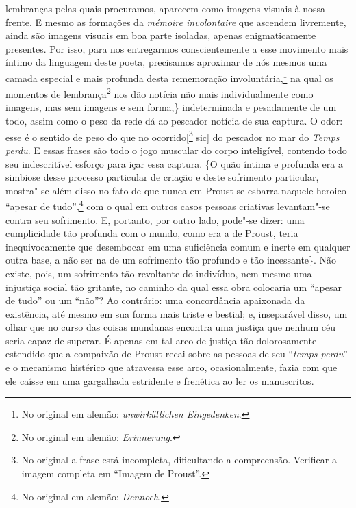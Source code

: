 lembranças pelas quais procuramos, aparecem como imagens visuais à nossa
frente. E mesmo as formações da \emph{mémoire involontaire} que ascendem
livremente, ainda são imagens visuais em boa parte isoladas, apenas
enigmaticamente presentes. Por isso, para nos entregarmos
conscientemente a esse movimento mais íntimo da linguagem deste poeta,
precisamos aproximar de nós mesmos uma camada especial e mais profunda
desta rememoração involuntária,\footnote{No original em alemão:
\emph{unwirküllichen Eingedenken}. \versal{[N.~T.]}} na qual os momentos de
lembrança\footnote{No original em alemão: \emph{Erinnerung}. \versal{[N.~T.]}} nos dão notícia
não mais individualmente como imagens, mas sem imagens e sem forma,\}
indeterminada e pesadamente de um todo, assim como o peso da rede dá ao
pescador notícia de sua captura. O odor: esse é o sentido de peso do que
no ocorrido{[}\footnote{No original a frase está incompleta,
  dificultando a compreensão. Verificar a imagem completa em ``Imagem de Proust''. \versal{[N.~T.]}} sic{]} do pescador no mar do \emph{Temps
perdu}. E essas frases são todo o jogo muscular do corpo inteligível,
contendo todo seu indescritível esforço para içar essa captura. \{O
quão íntima e profunda era a simbiose desse processo particular de
criação e deste sofrimento particular, mostra"-se além disso no fato
de que nunca em Proust se esbarra naquele heroico ``apesar de
tudo'',\footnote{No original em alemão: \emph{Dennoch}. \versal{[N.~T.]}} com o qual em outros
casos pessoas criativas levantam"-se contra seu sofrimento. E, portanto, por outro lado,
pode"-se dizer: uma cumplicidade tão profunda com o mundo,
como era a de Proust, teria inequivocamente que desembocar em uma
suficiência comum e inerte em qualquer outra base, a não ser na de um
sofrimento tão profundo e tão incessante\}. Não existe, pois, um
sofrimento tão revoltante do indivíduo, nem mesmo uma injustiça social
tão gritante, no caminho da qual essa obra colocaria um ``apesar de
tudo'' ou um ``não''? Ao contrário: uma concordância apaixonada da
existência, até mesmo em sua forma mais triste e bestial; e, inseparável
disso, um olhar que no curso das coisas mundanas encontra uma justiça
que nenhum céu seria capaz de superar. É apenas em tal arco de justiça
tão dolorosamente estendido que a compaixão de Proust recai
sobre as pessoas de seu ``\emph{temps perdu}'' e o mecanismo histérico
que atravessa esse arco, ocasionalmente, fazia com que ele caísse em uma gargalhada estridente e frenética ao ler os manuscritos.

